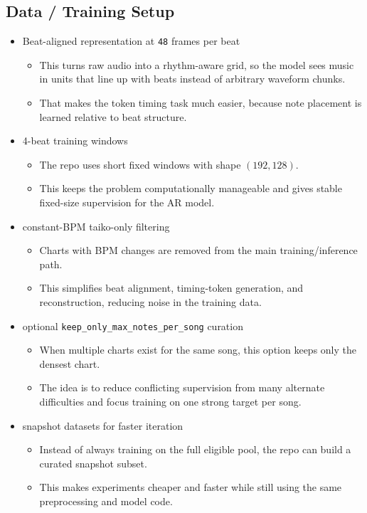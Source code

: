 \documentclass[11pt]{article}
\begin{document}
\subsection*{Data / Training Setup}

\begin{itemize}[leftmargin=1.5em]
    \item Beat-aligned representation at \texttt{48} frames per beat
    \begin{itemize}[leftmargin=1.5em]
        \item This turns raw audio into a rhythm-aware grid, so the model sees music in units that line up with beats instead of arbitrary waveform chunks.
        \item That makes the token timing task much easier, because note placement is learned relative to beat structure.
    \end{itemize}
    \item 4-beat training windows
    \begin{itemize}[leftmargin=1.5em]
        \item The repo uses short fixed windows with shape $(192, 128)$.
        \item This keeps the problem computationally manageable and gives stable fixed-size supervision for the AR model.
    \end{itemize}
    \item constant-BPM taiko-only filtering
    \begin{itemize}[leftmargin=1.5em]
        \item Charts with BPM changes are removed from the main training/inference path.
        \item This simplifies beat alignment, timing-token generation, and reconstruction, reducing noise in the training data.
    \end{itemize}
    \item optional \texttt{keep\_only\_max\_notes\_per\_song} curation
    \begin{itemize}[leftmargin=1.5em]
        \item When multiple charts exist for the same song, this option keeps only the densest chart.
        \item The idea is to reduce conflicting supervision from many alternate difficulties and focus training on one strong target per song.
    \end{itemize}
    \item snapshot datasets for faster iteration
    \begin{itemize}[leftmargin=1.5em]
        \item Instead of always training on the full eligible pool, the repo can build a curated snapshot subset.
        \item This makes experiments cheaper and faster while still using the same preprocessing and model code.
    \end{itemize}
\end{itemize}
\end{document}
